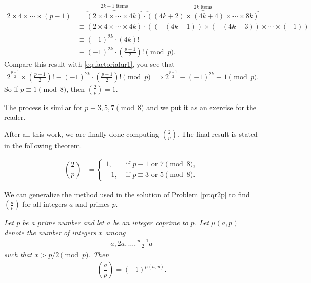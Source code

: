 \documentclass[12pt]{subfile}
\begin{document}
\begin{solution}
		\begin{align*}
		2 \times 4 \times \cdots \times (p-1) &= \overbrace{\left(2 \times 4 \times \cdots \times 4k\right)}^{2k+1 \text{ items}} \cdot \overbrace{\left((4k+2) \times (4k+4) \times \cdots \times 8k\right)}^{2k \text{ items}}\\
		& \equiv \left(2 \times 4 \times \cdots \times 4k\right) \cdot \left((-(4k-1)) \times (-(4k-3)) \times \cdots \times (-1)\right) \\
		& \equiv (-1)^{2k} \cdot (4k)!\\
		& \equiv (-1)^{2k} \cdot \left(\frac{p-1}{2}\right)! \pmod p.
		\end{align*} 
		Compare this result with \eqref{eq:factorialqr1}, you see that
		\begin{align*}
		2^\frac{p-1}{2} \times \left(\frac{p-1}{2}\right)! \equiv (-1)^{2k} \cdot \left(\frac{p-1}{2}\right)! \pmod p \implies 2^\frac{p-1}{2} \equiv (-1)^{2k} \equiv 1 \pmod p.
		\end{align*}
		So if $p \equiv 1 \pmod 8$, then $ \left(\frac{2}{p}\right)=1$.
		
		The process is similar for $p \equiv 3, 5, 7 \pmod 8$ and we put it as an exercise for the reader. 
		
		After all this work, we are finally done computing $ \left(\frac{2}{p}\right)$. The final result is stated in the following theorem.
		
		\begin{theorem}\slshape\label{thm:2qr}
			\begin{align*}
			\left(\dfrac{2}{p}\right) 
			& = 
			\begin{cases}
			1,&\mbox{ if } p \equiv 1 \mbox{ or } 7\pmod 8,\\
			-1,&\mbox{ if } p \equiv 3 \mbox{ or } 5\pmod 8.
			\end{cases}
			\end{align*}
		\end{theorem}
		
	\end{solution}
We can generalize the method used in the solution of Problem \ref{pr:qr2p} to find $ \left(\frac{a}{p}\right)$ for all integers $a$ and primes $p$.
	\begin{theorem}\slshape\label{thm:gausscriterion}
		Let $p$ be a prime number and let $a$ be an integer coprime to $p$. Let $\mu(a,p)$ denote the number of integers $x$ among
		\begin{align*}
		a, 2a, \ldots, \frac{p-1}{2}a
		\end{align*}
		such that $\displaystyle x > p/2 \pmod p$. Then
		\begin{align*}
		\left(\dfrac{a}{p}\right) = (-1)^{\mu(a,p)}.
		\end{align*}
	\end{theorem}
	
\end{document}
